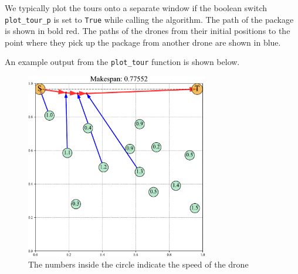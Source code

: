 \documentclass[12pt, english, oneside]{report}
\begin{document}
\begin{appendices}
We typically plot the tours onto a separate window if the boolean switch \verb|plot_tour_p| 
is set to \verb|True| while calling the algorithm. The path of the package is shown in bold red. 
The paths of the drones from their initial positions to the point where they pick up the package 
from another drone are shown in blue.

An example output from the \verb|plot_tour| function is shown below.

\begin{figure}[H]
\centering
\includegraphics[width=8cm]{docs/pho_example_plot.pdf}
\caption{The numbers inside the circle indicate the speed of the drone}
\end{figure}


\end{appendices}
\end{document}
